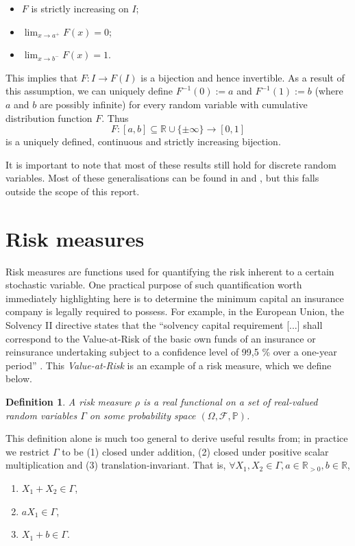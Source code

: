 \documentclass{article}
\newtheorem{definition}{Definition}
\begin{document}
\begin{itemize}
    \item $F$ is strictly increasing on $I$;
    \item $\lim_{x\rightarrow a^+} F(x) = 0$;
    \item $\lim_{x\rightarrow b^-} F(x) = 1$.
\end{itemize}

This implies that $F:I\rightarrow F(I)$ is a bijection and hence invertible. As a result of this assumption, we can uniquely define $F^{-1}(0) := a$ and $F^{-1}(1) := b$ (where $a$ and $b$ are possibly infinite) for every random variable with cumulative distribution function $F$. Thus $$F:[a,b]\subseteq \mathbb{R}\cup\{\pm\infty\}\rightarrow[0,1]$$ is a uniquely defined, continuous and strictly increasing bijection. 

It is important to note that most of these results still hold for discrete random variables. Most of these generalisations can be found in \cite{Risk_Measurement} and \cite{kaas-2000}, but this falls outside the scope of this report.

\section{Risk measures}

Risk measures are functions used for quantifying the risk inherent to a certain stochastic variable. One practical purpose of such quantification worth immediately highlighting here is to determine the minimum capital an insurance company is legally required to possess. For example, in the European Union, the Solvency II directive states that the ``solvency capital requirement [...] shall correspond to the Value-at-Risk of the basic own funds of an insurance or reinsurance undertaking subject to a confidence level of 99,5 \% over a one-year period'' \cite[Art. 101ter.]{SolvencyII}. This \textit{Value-at-Risk} is an example of a risk measure, which we define below.
\\
\begin{definition}\cite[Definition 6.2.1]{Risk_Measurement}
A risk measure $\rho$ is a real functional on a set of real-valued random variables $\Gamma$ on some probability space $(\Omega, \mathcal{F}, \mathbb{P})$. 
\end{definition}
This definition alone is much too general to derive useful results from; in practice we restrict $\Gamma$ to be (1) closed under addition, (2) closed under positive scalar multiplication and (3) translation-invariant. That is, $\forall X_1, X_2 \in \Gamma, a \in \mathbb{R}_{> 0}, b \in \mathbb{R}$, 
\begin{enumerate}
    \item $X_1 + X_2 \in \Gamma$,
    \item $a X_1 \in \Gamma$,
    \item $X_1 + b \in \Gamma$.
\end{enumerate}
\end{document}

